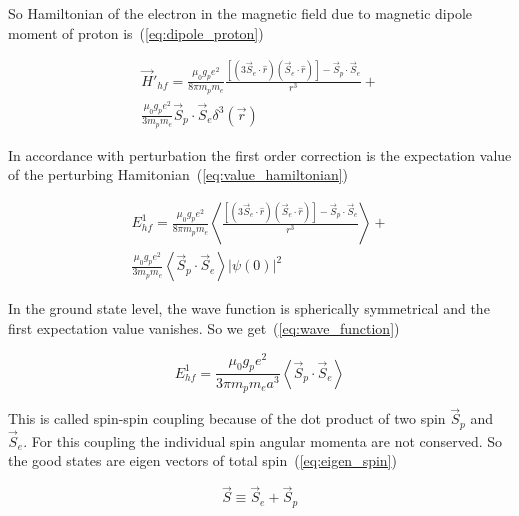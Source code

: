 \documentclass[conference]{IEEEtran}
\begin{document}
So Hamiltonian of the electron in the magnetic field due to magnetic dipole moment of proton is~(\ref{eq:dipole_proton})

\begin{equation}
\begin{split}
 \vec{H}'_{hf}=\frac{\mathit{\mu}_{0}g_{p}\mathit{e}^{2}}{8\mathit{\pi}\mathit{m}_{p}\mathit{m}_{e}}\frac{[(3\vec{S}_{e}\cdot\mathit{\hat{r}})(\vec{S}_{e}\cdot\mathit{\hat{r}})]-\vec{S}_{p}\cdot\vec{S}_{e}}{\mathit{r}^{3}}+\\\frac{\mathit{\mu}_{0}g_{p}\mathit{e}^{2}}{3\mathit{m}_{p}\mathit{m}_{e}}\vec{S}_{p}\cdot\vec{S}_{e}\delta^{3}(\vec{r})
\end{split}
 \label{eq:dipole_proton}  
\end{equation}

In accordance with perturbation the first order correction is the expectation value of the perturbing Hamitonian~(\ref{eq:value_hamiltonian})

\begin{equation}
\begin{split}
 \mathit{E}_{hf}^{1}=\frac{\mathit{\mu}_{0}g_{p}\mathit{e}^{2}}{8\mathit{\pi}\mathit{m}_{p}\mathit{m}_{e}}\left\langle\frac{[(3\vec{S}_{e}\cdot\mathit{\hat{r}})(\vec{S}_{e}\cdot\mathit{\hat{r}})]-\vec{S}_{p}\cdot\vec{S}_{e}}{\mathit{r}^{3}}\right\rangle+\\\frac{\mathit{\mu}_{0}g_{p}\mathit{e}^{2}}{3\mathit{m}_{p}\mathit{m}_{e}}\left\langle\vec{S}_{p}\cdot\vec{S}_{e}\right\rangle\vert\mathit{\psi}\left(0\right)\vert^{2}
\end{split}
 \label{eq:value_hamiltonian} 
\end{equation}

In the ground state level, the wave function is spherically symmetrical and the first expectation value vanishes. So we get~(\ref{eq:wave_function})

\begin{equation}
 \mathit{E}_{hf}^{1}=\frac{\mathit{\mu}_{0}g_{p}e^{2}}{3\pi\mathit{m}_{p}\mathit{m}_{e}\mathit{a}^{3}}\left\langle\vec{S}_{p}\cdot\vec{S}_{e}\right\rangle
 \label{eq:wave_function}
\end{equation}

This is called spin-spin coupling because of the dot product of two spin $\vec{S}_{p}$ and $\vec{S}_{e}$. For this coupling the individual spin angular momenta are not conserved. So the good states are eigen vectors of total spin~(\ref{eq:eigen_spin})

\begin{equation}
 \vec{S}\equiv\vec{S}_{e}+\vec{S}_{p}
 \label{eq:eigen_spin}
\end{equation}
\end{document}
